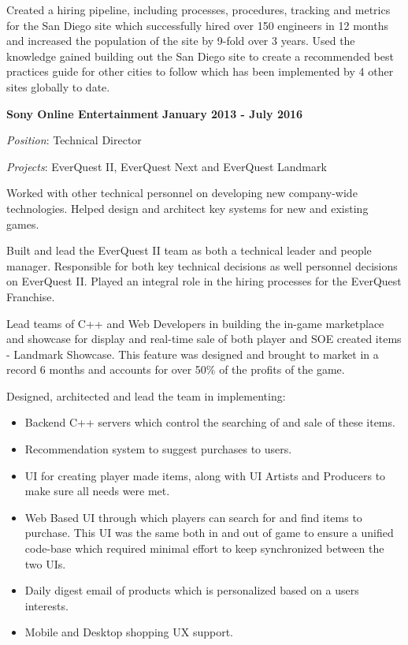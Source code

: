 \documentclass{article}
\begin{document}
\par
\vspace{\baselineskip}
Created a hiring pipeline, including processes, procedures, tracking and metrics for the San Diego site which successfully hired over 150 engineers in 12 months and increased the population of the site by 9-fold over 3 years.  
Used the knowledge gained building out the San Diego site to create a recommended best practices guide for other cities to follow which has been implemented by 4 other sites globally to date.  
\par
\vspace{\baselineskip}
{\bf Sony Online Entertainment}
\hfill {\bf January 2013 - July 2016}
\vspace{.03in}
\par
{\it Position}: Technical Director
\par
{\it Projects}: EverQuest II, EverQuest Next and EverQuest Landmark
\vspace{\baselineskip}
\par
Worked with other technical personnel on developing new company-wide
technologies.  Helped design and architect key systems for new and existing
games.
\par
\vspace{\baselineskip}
Built and lead the EverQuest II team as both a technical leader and people manager.  Responsible for both key technical decisions as well personnel decisions on EverQuest II.  Played an integral role in the hiring processes for the EverQuest Franchise.
\par
\vspace{\baselineskip}
Lead teams of C++ and Web Developers in building the
in-game marketplace and showcase for display and real-time sale of both player and SOE created items - 
Landmark Showcase.  This
feature was designed and brought to market in a record 6 months and accounts
for over 50\% of the profits of the game.
\par
\vspace{\baselineskip}
Designed, architected and lead the team in implementing: 
\begin{small}
\begin{itemize}
  \item Backend C++ servers which control the searching of and sale of these items.
  \item Recommendation system to suggest purchases to users.
  \item UI for creating player made items, along with UI Artists  and Producers to make sure all needs were met.
  \item Web Based UI through which players can search for and find items to purchase.  This UI was the same both in and out of game to ensure a unified code-base which required minimal effort to keep synchronized between the two UIs.
  \item Daily digest email of products which is personalized based on a users interests.
  \item Mobile and Desktop shopping UX support.
\end{itemize}
\end{small}
\end{document}

